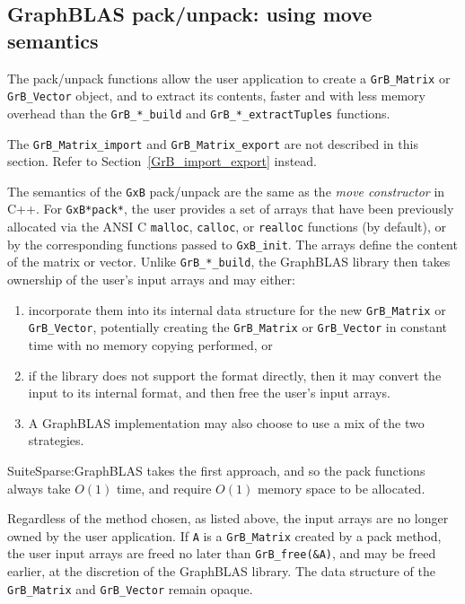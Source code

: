 \documentclass[12pt]{article}
\begin{document}
\subsection{GraphBLAS pack/unpack: using move semantics} %
\label{pack_unpack}

The pack/unpack functions allow the user application to create a
\verb'GrB_Matrix' or \verb'GrB_Vector' object, and to extract its contents,
faster and with less memory overhead than the \verb'GrB_*_build' and
\verb'GrB_*_extractTuples' functions.

The \verb'GrB_Matrix_import' and \verb'GrB_Matrix_export' are not
described in this section.  Refer to Section~\ref{GrB_import_export} instead.

The semantics of the \verb'GxB' pack/unpack are the same as the
{\em move constructor} in C++.  For \verb'GxB*pack*', the user provides a set of
arrays that have been previously allocated via the ANSI C \verb'malloc',
\verb'calloc', or \verb'realloc' functions (by default), or by the
corresponding functions passed to \verb'GxB_init'.  The arrays define the
content of the matrix or vector.  Unlike \verb'GrB_*_build', the GraphBLAS
library then takes ownership of the user's input arrays and may either:

\begin{enumerate}
\item incorporate them
into its internal data structure for the new \verb'GrB_Matrix' or
\verb'GrB_Vector', potentially creating the \verb'GrB_Matrix' or
\verb'GrB_Vector' in constant time with no memory copying performed, or
\item if
the library does not support the format directly, then it may convert
the input to its internal format, and then free the user's input arrays.
\item A
GraphBLAS implementation may also choose to use a mix of the two strategies.
\end{enumerate}

SuiteSparse:GraphBLAS takes the first approach, and so the pack
functions always take $O(1)$ time, and require $O(1)$ memory space to be
allocated.

Regardless of the method chosen, as listed above, the input arrays are no
longer owned by the user application.  If \verb'A' is a \verb'GrB_Matrix'
created by a pack method, the user input arrays are freed no later than
\verb'GrB_free(&A)', and may be freed earlier, at the discretion of the
GraphBLAS library.  The data structure of the \verb'GrB_Matrix' and
\verb'GrB_Vector' remain opaque.
\end{document}
